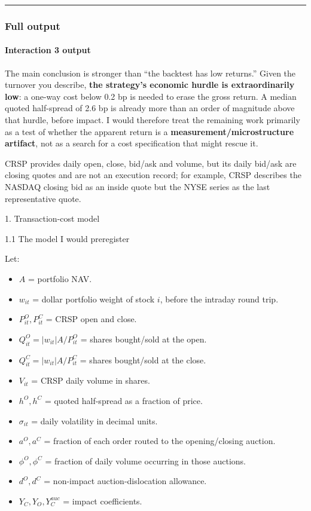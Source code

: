 \begin{center}\rule{0.5\linewidth}{0.5pt}\end{center}

\hypertarget{full-output}{%
\subsubsection{Full output}\label{full-output}}

\hypertarget{interaction-3-output}{%
\paragraph{Interaction 3 output}\label{interaction-3-output}}

The main conclusion is stronger than ``the backtest has low returns.'' Given the turnover you describe, \textbf{the strategy's economic hurdle is extraordinarily low}: a one-way cost below 0.2 bp is needed to erase the gross return. A median quoted half-spread of 2.6 bp is already more than an order of magnitude above that hurdle, before impact. I would therefore treat the remaining work primarily as a test of whether the apparent return is a \textbf{measurement/microstructure artifact}, not as a search for a cost specification that might rescue it.

CRSP provides daily open, close, bid/ask and volume, but its daily bid/ask are closing quotes and are not an execution record; for example, CRSP describes the NASDAQ closing bid as an inside quote but the NYSE series as the last representative quote.

1. Transaction-cost model

1.1 The model I would preregister

Let:

\begin{itemize}
\tightlist
\item
  \(A\) = portfolio NAV.
\item
  \(w_{it}\) = dollar portfolio weight of stock \(i\), before the intraday round trip.
\item
  \(P^O_{it},P^C_{it}\) = CRSP open and close.
\item
  \(Q^O_{it}=|w_{it}|A/P^O_{it}\) = shares bought/sold at the open.
\item
  \(Q^C_{it}=|w_{it}|A/P^C_{it}\) = shares bought/sold at the close.
\item
  \(V_{it}\) = CRSP daily volume in shares.
\item
  \(h^O,h^C\) = quoted half-spread as a fraction of price.
\item
  \(\sigma_{it}\) = daily volatility in decimal units.
\item
  \(a^O,a^C\) = fraction of each order routed to the opening/closing auction.
\item
  \(\phi^O,\phi^C\) = fraction of daily volume occurring in those auctions.
\item
  \(d^O,d^C\) = non-impact auction-dislocation allowance.
\item
  \(Y_C,Y_O,Y_C^{auc}\) = impact coefficients.
\end{itemize}

